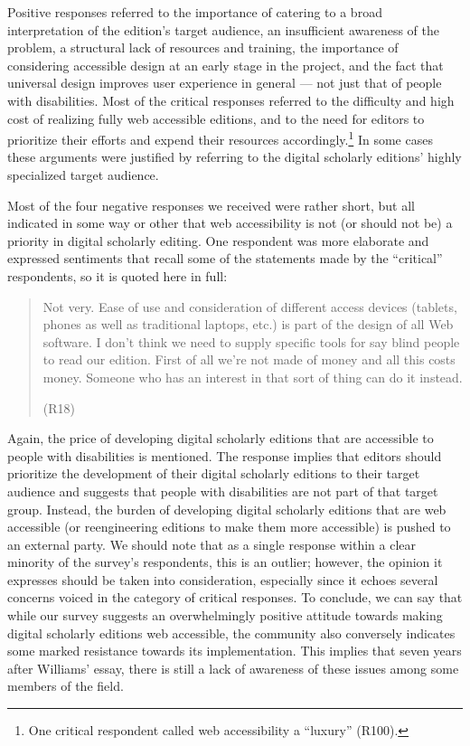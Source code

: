 \begin{paper}
Positive responses referred to the importance of catering to a broad
interpretation of the edition's target audience, an insufficient
awareness of the problem, a structural lack of resources and training,
the importance of considering accessible design at an early stage in the
project, and the fact that universal design improves user experience in
general --- not just that of people with disabilities. Most of the
critical responses referred to the difficulty and high cost of realizing
fully web accessible editions, and to the need for editors to prioritize
their efforts and expend their resources accordingly.\footnote{One
  critical respondent called web accessibility a ``luxury'' (R100).} In
some cases these arguments were justified by referring to the digital
scholarly editions' highly specialized target audience.

Most of the four negative responses we received were rather short, but
all indicated in some way or other that web accessibility is not (or
should not be) a priority in digital scholarly editing. One respondent
was more elaborate and expressed sentiments that recall some of the
statements made by the ``critical'' respondents, so it is quoted here in
full:
\begin{quote}
Not very. Ease of use and consideration of different access devices
(tablets, phones as well as traditional laptops, etc.) is part of the
design of all Web software. I don't think we need to supply specific
tools for say blind people to read our edition. First of all we're not
made of money and all this costs money. Someone who has an interest in
that sort of thing can do it instead.
\begin{flushright}
(R18)
\end{flushright}
\end{quote}
Again, the price of developing digital scholarly editions that are
accessible to people with disabilities is mentioned. The response
implies that editors should prioritize the development of their digital
scholarly editions to their target audience and suggests that people
with disabilities are not part of that target group. Instead, the burden
of developing digital scholarly editions that are web accessible (or
reengineering editions to make them more accessible) is pushed to an
external party. We should note that as a single response within a clear
minority of the survey's respondents, this is an outlier; however, the
opinion it expresses should be taken into consideration, especially
since it echoes several concerns voiced in the category of critical
responses. To conclude, we can say that while our survey suggests an
overwhelmingly positive attitude towards making digital scholarly
editions web accessible, the community also conversely indicates some
marked resistance towards its implementation. This implies that seven
years after Williams' essay, there is still a lack of awareness of these
issues among some members of the field.



\end{paper}

